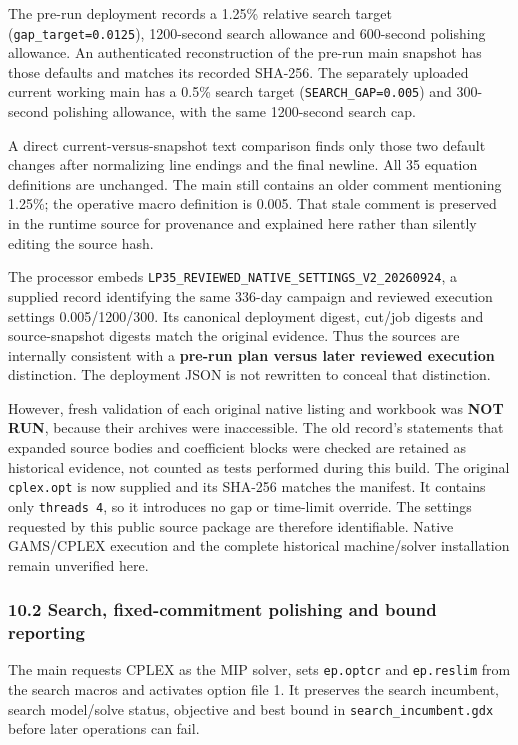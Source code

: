\documentclass[
  11pt,
  a4paper,
]{article}
\begin{document}
The pre-run deployment records a 1.25\% relative search target
(\texttt{gap\_target=0.0125}), 1200-second search allowance and
600-second polishing allowance. An authenticated reconstruction of the
pre-run main snapshot has those defaults and matches its recorded
SHA-256. The separately uploaded current working main has a 0.5\% search
target (\texttt{SEARCH\_GAP=0.005}) and 300-second polishing allowance,
with the same 1200-second search cap.

A direct current-versus-snapshot text comparison finds only those two
default changes after normalizing line endings and the final newline.
All 35 equation definitions are unchanged. The main still contains an
older comment mentioning 1.25\%; the operative macro definition is
0.005. That stale comment is preserved in the runtime source for
provenance and explained here rather than silently editing the source
hash.

The processor embeds
\texttt{LP35\_REVIEWED\_NATIVE\_SETTINGS\_V2\_20260924}, a supplied
record identifying the same 336-day campaign and reviewed execution
settings 0.005/1200/300. Its canonical deployment digest, cut/job
digests and source-snapshot digests match the original evidence. Thus
the sources are internally consistent with a \textbf{pre-run plan versus
later reviewed execution} distinction. The deployment JSON is not
rewritten to conceal that distinction.

However, fresh validation of each original native listing and workbook
was \textbf{NOT RUN}, because their archives were inaccessible. The old
record's statements that expanded source bodies and coefficient blocks
were checked are retained as historical evidence, not counted as tests
performed during this build. The original \texttt{cplex.opt} is now
supplied and its SHA-256 matches the manifest. It contains only
\texttt{threads\ 4}, so it introduces no gap or time-limit override. The
settings requested by this public source package are therefore
identifiable. Native GAMS/CPLEX execution and the complete historical
machine/solver installation remain unverified here.

\subsubsection{10.2 Search, fixed-commitment polishing and bound
reporting}\label{search-fixed-commitment-polishing-and-bound-reporting}

The main requests CPLEX as the MIP solver, sets \texttt{ep.optcr} and
\texttt{ep.reslim} from the search macros and activates option file 1.
It preserves the search incumbent, search model/solve status, objective
and best bound in \texttt{search\_incumbent.gdx} before later operations
can fail.
\end{document}
